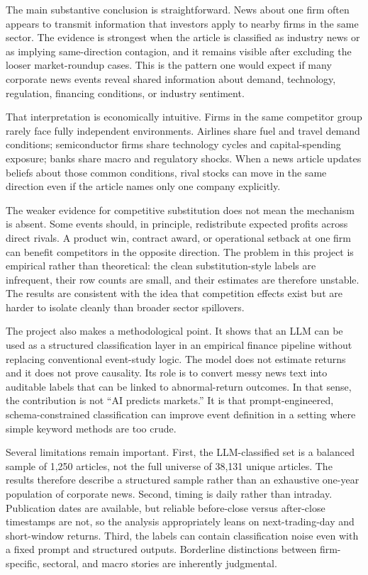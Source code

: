 \documentclass[11pt]{article}
\begin{document}
The main substantive conclusion is straightforward. News about one firm often appears to transmit information that investors apply to nearby firms in the same sector. The evidence is strongest when the article is classified as industry news or as implying same-direction contagion, and it remains visible after excluding the looser market-roundup cases. This is the pattern one would expect if many corporate news events reveal shared information about demand, technology, regulation, financing conditions, or industry sentiment.

That interpretation is economically intuitive. Firms in the same competitor group rarely face fully independent environments. Airlines share fuel and travel demand conditions; semiconductor firms share technology cycles and capital-spending exposure; banks share macro and regulatory shocks. When a news article updates beliefs about those common conditions, rival stocks can move in the same direction even if the article names only one company explicitly.

The weaker evidence for competitive substitution does not mean the mechanism is absent. Some events should, in principle, redistribute expected profits across direct rivals. A product win, contract award, or operational setback at one firm can benefit competitors in the opposite direction. The problem in this project is empirical rather than theoretical: the clean substitution-style labels are infrequent, their row counts are small, and their estimates are therefore unstable. The results are consistent with the idea that competition effects exist but are harder to isolate cleanly than broader sector spillovers.

The project also makes a methodological point. It shows that an LLM can be used as a structured classification layer in an empirical finance pipeline without replacing conventional event-study logic. The model does not estimate returns and it does not prove causality. Its role is to convert messy news text into auditable labels that can be linked to abnormal-return outcomes. In that sense, the contribution is not ``AI predicts markets.'' It is that prompt-engineered, schema-constrained classification can improve event definition in a setting where simple keyword methods are too crude.

Several limitations remain important. First, the LLM-classified set is a balanced sample of 1,250 articles, not the full universe of 38,131 unique articles. The results therefore describe a structured sample rather than an exhaustive one-year population of corporate news. Second, timing is daily rather than intraday. Publication dates are available, but reliable before-close versus after-close timestamps are not, so the analysis appropriately leans on next-trading-day and short-window returns. Third, the labels can contain classification noise even with a fixed prompt and structured outputs. Borderline distinctions between firm-specific, sectoral, and macro stories are inherently judgmental.
\end{document}
